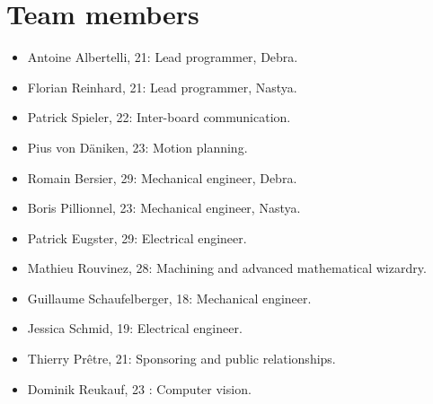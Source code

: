 \documentclass[a4paper]{paper}
\begin{document}
\section{Team members}
\begin{itemize}
    \item Antoine Albertelli, 21:  Lead programmer, Debra.
    \item Florian Reinhard, 21:  Lead programmer, Nastya.
    \item Patrick Spieler, 22:  Inter-board communication.
    \item Pius von Däniken, 23:  Motion planning.
    \item Romain Bersier, 29:  Mechanical engineer, Debra.
    \item Boris Pillionnel, 23:  Mechanical engineer, Nastya.
    \item Patrick Eugster, 29:  Electrical engineer.
    \item Mathieu Rouvinez, 28:  Machining and advanced mathematical wizardry.
    \item Guillaume Schaufelberger, 18: Mechanical engineer.
    \item Jessica Schmid, 19: Electrical engineer.
    \item Thierry Prêtre, 21:  Sponsoring and public relationships.
    \item Dominik Reukauf, 23 : Computer vision.
\end{itemize}

\clearpage


\end{document}
